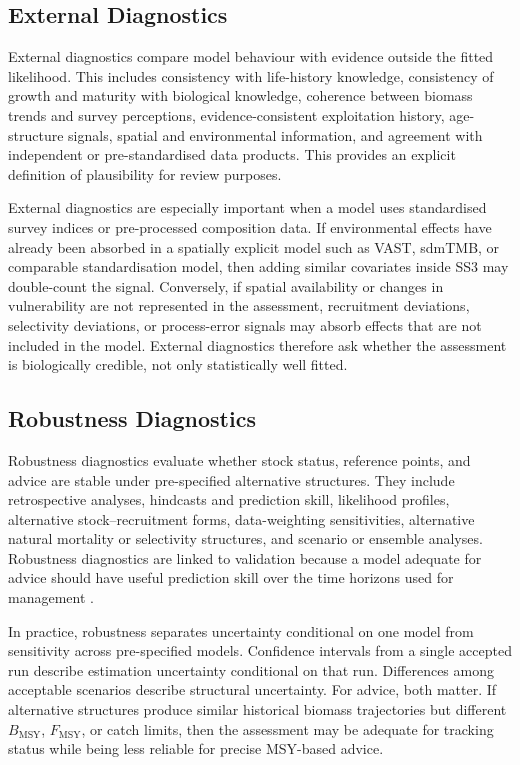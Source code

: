 \documentclass[11pt,a4paper]{article}
\begin{document}
\subsection{External Diagnostics}
External diagnostics compare model behaviour with evidence outside the fitted likelihood. This includes consistency with life-history knowledge, consistency of growth and maturity with biological knowledge, coherence between biomass trends and survey perceptions, evidence-consistent exploitation history, age-structure signals, spatial and environmental information, and agreement with independent or pre-standardised data products. This provides an explicit definition of plausibility for review purposes.

External diagnostics are especially important when a model uses standardised survey indices or pre-processed composition data. If environmental effects have already been absorbed in a spatially explicit model such as VAST, sdmTMB, or comparable standardisation model, then adding similar covariates inside SS3 may double-count the signal. Conversely, if spatial availability or changes in vulnerability are not represented in the assessment, recruitment deviations, selectivity deviations, or process-error signals may absorb effects that are not included in the model. External diagnostics therefore ask whether the assessment is biologically credible, not only statistically well fitted.

\subsection{Robustness Diagnostics}

Robustness diagnostics evaluate whether stock status, reference points, and advice are stable under pre-specified alternative structures. They include retrospective analyses, hindcasts and prediction skill, likelihood profiles, alternative stock--recruitment forms, data-weighting sensitivities, alternative natural mortality or selectivity structures, and scenario or ensemble analyses. Robustness diagnostics are linked to validation because a model adequate for advice should have useful prediction skill over the time horizons used for management \citep{kell2016evaluation,kell2024empirical}.

In practice, robustness separates uncertainty conditional on one model from sensitivity across pre-specified models. Confidence intervals from a single accepted run describe estimation uncertainty conditional on that run. Differences among acceptable scenarios describe structural uncertainty. For advice, both matter. If alternative structures produce similar historical biomass trajectories but different $B_{\mathrm{MSY}}$, $F_{\mathrm{MSY}}$, or catch limits, then the assessment may be adequate for tracking status while being less reliable for precise MSY-based advice.
\end{document}
